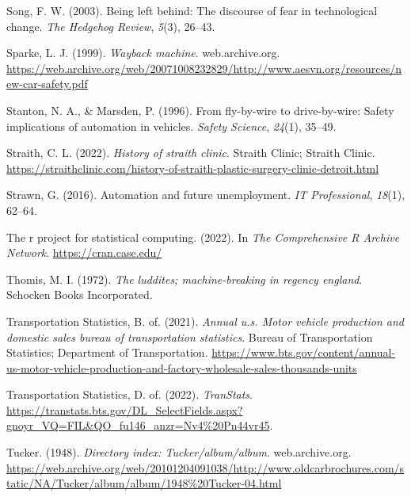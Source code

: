 \documentclass[
  man,floatsintext]{apa7}
\newlength{\cslhangindent}
\newlength{\cslentryspacingunit} %
\newenvironment{CSLReferences}[2] %
 {%
  \setlength{\parindent}{0pt}
  \ifodd #1
  \let\oldpar\par
  \def\par{\hangindent=\cslhangindent\oldpar}
  \fi
  \setlength{\parskip}{#2\cslentryspacingunit}
 }%
 {}
\begin{document}
\begin{CSLReferences}{1}{0}
\leavevmode{}%
Song, F. W. (2003). Being left behind: The discourse of fear in technological change. \emph{The Hedgehog Review}, \emph{5}(3), 26--43.

\leavevmode{}%
Sparke, L. J. (1999). \emph{Wayback machine}. web.archive.org. \url{https://web.archive.org/web/20071008232829/http://www.aesvn.org/resources/new-car-safety.pdf}

\leavevmode{}%
Stanton, N. A., \& Marsden, P. (1996). From fly-by-wire to drive-by-wire: Safety implications of automation in vehicles. \emph{Safety Science}, \emph{24}(1), 35--49.

\leavevmode{}%
Straith, C. L. (2022). \emph{History of straith clinic}. Straith Clinic; Straith Clinic. \url{https://straithclinic.com/history-of-straith-plastic-surgery-clinic-detroit.html}

\leavevmode{}%
Strawn, G. (2016). Automation and future unemployment. \emph{IT Professional}, \emph{18}(1), 62--64.

\leavevmode{}%
The r project for statistical computing. (2022). In \emph{The Comprehensive R Archive Network}. \url{https://cran.case.edu/}

\leavevmode{}%
Thomis, M. I. (1972). \emph{The luddites; machine-breaking in regency england}. Schocken Books Incorporated.

\leavevmode{}%
Transportation Statistics, B. of. (2021). \emph{Annual u.s. Motor vehicle production and domestic sales \textbar{} bureau of transportation statistics}. Bureau of Transportation Statistics; Department of Transportation. \url{https://www.bts.gov/content/annual-us-motor-vehicle-production-and-factory-wholesale-sales-thousands-units}

\leavevmode{}%
Transportation Statistics, D. of. (2022). \emph{TranStats}. \url{https://transtats.bts.gov/DL_SelectFields.aspx?gnoyr_VQ=FIL\&QO_fu146_anzr=Nv4\%20Pn44vr45}.

\leavevmode{}%
Tucker. (1948). \emph{Directory index: Tucker/album/album}. web.archive.org. \url{https://web.archive.org/web/20101204091038/http://www.oldcarbrochures.com/static/NA/Tucker/album/album/1948\%20Tucker-04.html}


\end{CSLReferences}
\end{document}
